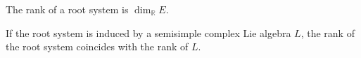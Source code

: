 The rank of a root system is $\dim_{\mathbb{R}} E$.

If the root system is induced by a semisimple complex Lie algebra $L$, the rank
of the root system coincides with the rank of $L$.
